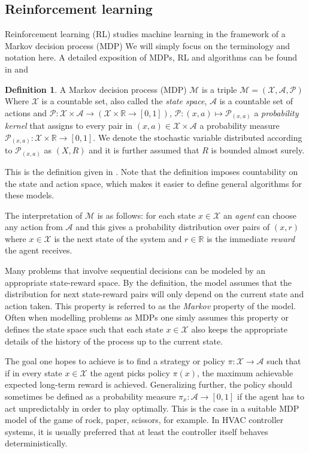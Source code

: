 \documentclass{article}
\theoremstyle{definition}
\newtheorem{definition}[theorem]{Definition}
\theoremstyle{remark}
\newcommand{\mar}{\mathcal{M}}
\newcommand{\stat}{\mathcal{X}}
\newcommand{\act}{\mathcal{A}}
\newcommand{\prob}{\mathcal{P}}
\newcommand{\R}{\mathbb{R}}
\begin{document}
\FloatBarrier
\subsection{Reinforcement learning}\label{theory:RL}

Reinforcement learning (RL) studies machine learning in the framework of a Markov decision process (MDP)
We will simply focus on the terminology and notation here. A detailed exposition of MDPs, RL and 
algorithms can be found in \cite{suttonbarto2018} and \cite{Szepesvari2010}

\begin{definition} A Markov decision process (MDP)  $\mar$ is a triple $\mar = (\stat, \act, \prob)$
Where $\stat$ is a countable set, also called the \emph{state space}, $\act$ is a countable set of actions and $\prob: \stat \times \act \rightarrow (\stat \times \R \rightarrow [0,1])$, $\prob: (x,a) \mapsto \prob_{(x,a)}$ a \emph{probability kernel} that assigns to every pair in $(x,a) \in \stat \times \act$ a probability measure $\prob_{(x,a)}:\stat \times \R \rightarrow [0,1]$. We denote the stochastic variable distributed according to $\prob_{(x,a)}$ as $(X,R)$ and it is further assumed that $R$ is bounded almost surely.
\end{definition}
This is the definition given in \cite{Szepesvari2010}.
Note that the definition imposes countability on the state and action space, which makes it
easier to define general algorithms for these models.

The interpretation of $\mar$ is as follows: for each state $x\in\stat$ an \emph{agent} can choose any
action from $\act$ and this gives a probability distribution over pairs of $(x,r)$ where $x\in\stat$ 
is the next state of the system and
$r\in \R$ is the immediate \emph{reward} the agent receives. 

Many problems that involve sequential 
decisions can be modeled by an appropriate state-reward space. By the definition, the model
assumes that the distribution for next state-reward pairs will only depend on the current state and
action taken. This property is referred to as the \emph{Markov} property of the model. Often when modelling
problems as MDPs one simly assumes this property or defines the state space such that each
state $x\in \stat$ also keeps the appropriate details of the history of the process up to the current state.

The goal one hopes to achieve is to find a strategy or policy $\pi : \stat \rightarrow \act$ such that if in
every state $x\in\stat$ the agent picks policy $\pi(x)$, the maximum achievable expected long-term reward is achieved. Generalizing further, the policy should sometimes be defined as a probability measure $\pi_x:\act \rightarrow [0,1]$ if the agent has to act unpredictably in order to play optimally. This is the case in a suitable
MDP model of the
game of rock, paper, scissors, for example. In HVAC controller systems, it is usually preferred that at least the controller itself behaves deterministically.
\end{document}
